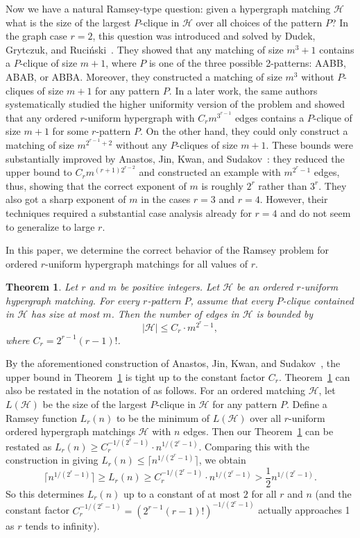 \documentclass[11pt]{article}
\newtheorem{theorem}{Theorem}[section]
\theoremstyle{definition}
\numberwithin{equation}{section}
\numberwithin{figure}{section}
\newcommand{\HH}{\mathcal{H}}
\begin{document}
Now we have a natural Ramsey-type question: given a hypergraph matching $\HH$ what is the size of the largest $P$-clique in $\HH$ over all choices of the pattern $P$? In the graph case $r=2$, this question was introduced and solved by
Dudek, Grytczuk, and Ruci\'nski~\cite{DGR22}. They showed that any matching of size $m^3+1$ contains a $P$-clique of size $m+1$, where $P$ is one of the three possible 2-patterns: AABB, ABAB, or ABBA. Moreover, they constructed a matching of size $m^3$ without $P$-cliques of size $m+1$ for any pattern $P$. 
In a later work, the same authors~\cite{DGR} systematically studied the higher uniformity version of the problem and showed that any ordered $r$-uniform hypergraph with $C_r m^{3^{r-1}}$ edges contains a $P$-clique of size $m+1$ for some $r$-pattern $P$. On the other hand, they could only construct a matching of size $m^{2^{r-1}+2}$ without any $P$-cliques of size $m+1$. These bounds were substantially improved by Anastos, Jin, Kwan, and Sudakov~\cite{AJKS}: they reduced the upper bound to $C_r m^{(r+1) 2^{r-2}}$ and constructed an example with $m^{2^{r}-1}$ edges, thus, showing that the correct exponent of $m$ is roughly $2^r$ rather than $3^r$. They also got a sharp exponent of $m$ in the cases $r=3$ and $r=4$. However, their techniques required a substantial case analysis already for $r=4$ and do not seem to generalize to large $r$.

In this paper, we determine the correct behavior of the Ramsey problem for ordered $r$-uniform hypergraph matchings for all values of $r$.

\begin{theorem} \label{thm-main}
Let $r$ and $m$ be positive integers. Let $\HH$ be an ordered $r$-uniform hypergraph matching. For every $r$-pattern $P$, assume that every $P$-clique contained in $\HH$ has size at most $m$. Then the number of edges in $\HH$ is bounded by
\[|\HH|\le C_r\cdot m^{2^r-1},\]
where $C_r=2^{r-1}(r-1)!$.
\end{theorem}

By the aforementioned construction of Anastos, Jin, Kwan, and Sudakov~\cite[Theorem 1.7]{AJKS}, the upper bound in Theorem~\ref{thm-main} is tight up to the constant factor $C_r$. Theorem~\ref{thm-main} can also be restated in the notation of \cite{AJKS} as follows. For an ordered matching $\HH$, let $L(\HH)$ be the size of the largest $P$-clique in $\HH$ for any pattern $P$. Define a Ramsey function $L_r(n)$ to be the minimum of $L(\HH)$ over all $r$-uniform ordered hypergraph matchings $\HH$ with $n$ edges. Then our Theorem~\ref{thm-main} can be restated as $L_r(n) \ge C_r^{-1/(2^r-1)}\cdot n^{1/(2^r-1)}$. Comparing this with the construction in \cite{AJKS} giving $L_r(n) \le \lceil n^{1/(2^r-1)} \rceil$, we obtain
$$
\lceil n^{1/(2^r-1)} \rceil \ge L_r(n) \ge C_r^{-1/(2^r-1)}\cdot n^{1/(2^r-1)}  > \frac{1}{2}n^{1/(2^r-1)}.
$$
So this determines $L_r(n)$ up to a constant of at most $2$ for all $r$ and $n$ (and the constant factor $C_r^{-1/(2^r-1)}=(2^{r-1}(r-1)!)^{-1/(2^r-1)}$ actually approaches 1 as $r$ tends to infinity).
\end{document}
